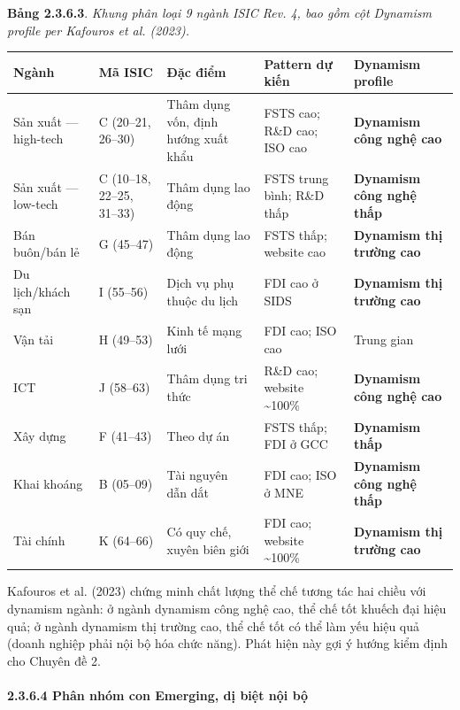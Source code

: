\documentclass[12pt,a4paper]{article}
\begin{document}
\textbf{Bảng 2.3.6.3}. \emph{Khung phân loại 9 ngành ISIC Rev. 4, bao
gồm cột Dynamism profile per Kafouros et al. (2023).}

\begin{longtable}[]{@{}lllll@{}}
\toprule\noalign{}
Ngành & Mã ISIC & Đặc điểm & Pattern dự kiến & Dynamism profile \\
\midrule\noalign{}
\endhead
\bottomrule\noalign{}
\endlastfoot
Sản xuất --- high-tech & C (20--21, 26--30) & Thâm dụng vốn, định hướng
xuất khẩu & FSTS cao; R\&D cao; ISO cao & \textbf{Dynamism công nghệ
cao} \\
Sản xuất --- low-tech & C (10--18, 22--25, 31--33) & Thâm dụng lao động
& FSTS trung bình; R\&D thấp & \textbf{Dynamism công nghệ thấp} \\
Bán buôn/bán lẻ & G (45--47) & Thâm dụng lao động & FSTS thấp; website
cao & \textbf{Dynamism thị trường cao} \\
Du lịch/khách sạn & I (55--56) & Dịch vụ phụ thuộc du lịch & FDI cao ở
SIDS & \textbf{Dynamism thị trường cao} \\
Vận tải & H (49--53) & Kinh tế mạng lưới & FDI cao; ISO cao & Trung
gian \\
ICT & J (58--63) & Thâm dụng tri thức & R\&D cao; website
\textasciitilde100\% & \textbf{Dynamism công nghệ cao} \\
Xây dựng & F (41--43) & Theo dự án & FSTS thấp; FDI ở GCC &
\textbf{Dynamism thấp} \\
Khai khoáng & B (05--09) & Tài nguyên dẫn dắt & FDI cao; ISO ở MNE &
\textbf{Dynamism công nghệ thấp} \\
Tài chính & K (64--66) & Có quy chế, xuyên biên giới & FDI cao; website
\textasciitilde100\% & \textbf{Dynamism thị trường cao} \\
\end{longtable}

Kafouros et al. (2023) chứng minh chất lượng thể chế tương tác hai chiều
với dynamism ngành: ở ngành dynamism công nghệ cao, thể chế tốt khuếch
đại hiệu quả; ở ngành dynamism thị trường cao, thể chế tốt có thể làm
yếu hiệu quả (doanh nghiệp phải nội bộ hóa chức năng). Phát hiện này gợi
ý hướng kiểm định cho Chuyên đề 2.

\hypertarget{2364-phuxe2n-nhuxf3m-con-emerging-dux1ecb-biux1ec7t-nux1ed9i-bux1ed9}{%
\paragraph{2.3.6.4 Phân nhóm con Emerging, dị biệt nội
bộ}\label{2364-phuxe2n-nhuxf3m-con-emerging-dux1ecb-biux1ec7t-nux1ed9i-bux1ed9}}
\end{document}

